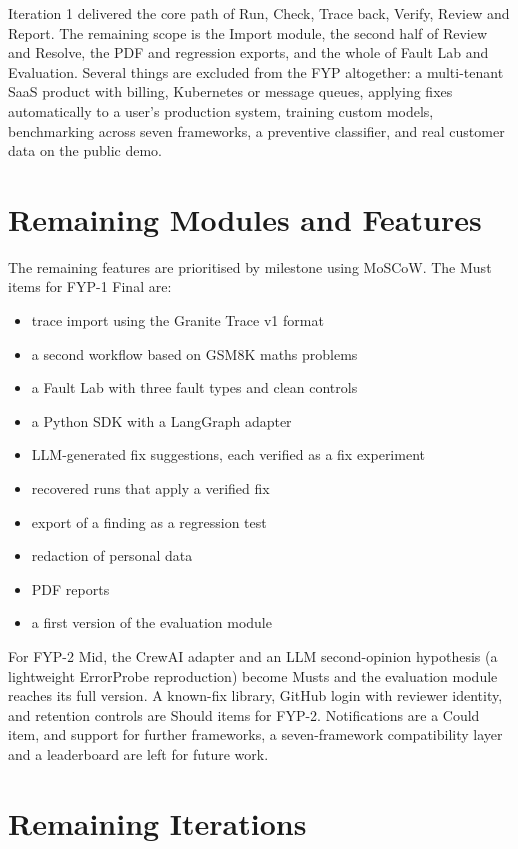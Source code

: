 \documentclass{fast-nuces-bs}
\begin{document}
Iteration 1 delivered the core path of Run, Check, Trace back, Verify, Review and Report. The remaining scope is the Import module, the second half of Review and Resolve, the PDF and regression exports, and the whole of Fault Lab and Evaluation. Several things are excluded from the FYP altogether: a multi-tenant SaaS product with billing, Kubernetes or message queues, applying fixes automatically to a user's production system, training custom models, benchmarking across seven frameworks, a preventive classifier, and real customer data on the public demo.

\section{Remaining Modules and Features}

The remaining features are prioritised by milestone using MoSCoW. The Must items for FYP-1 Final are:

\begin{itemize}
\item trace import using the Granite Trace v1 format
\item a second workflow based on GSM8K maths problems
\item a Fault Lab with three fault types and clean controls
\item a Python SDK with a LangGraph adapter
\item LLM-generated fix suggestions, each verified as a fix experiment
\item recovered runs that apply a verified fix
\item export of a finding as a regression test
\item redaction of personal data
\item PDF reports
\item a first version of the evaluation module
\end{itemize}

For FYP-2 Mid, the CrewAI adapter and an LLM second-opinion hypothesis (a lightweight ErrorProbe reproduction) become Musts and the evaluation module reaches its full version. A known-fix library, GitHub login with reviewer identity, and retention controls are Should items for FYP-2. Notifications are a Could item, and support for further frameworks, a seven-framework compatibility layer and a leaderboard are left for future work.

\section{Remaining Iterations}
\end{document}
